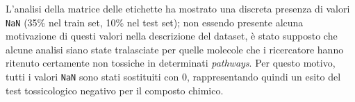 L'analisi della matrice delle etichette ha mostrato una discreta presenza di valori \texttt{NaN} (35\% nel train set, 10\% nel test set); non essendo presente alcuna motivazione di questi valori nella descrizione del dataset, è stato supposto che alcune analisi siano state tralasciate per quelle molecole che i ricercatore hanno ritenuto certamente non tossiche in determinati \textit{pathways}. Per questo motivo, tutti i valori \texttt{NaN} sono stati sostituiti con $0$, rappresentando quindi un esito del test tossicologico negativo per il composto chimico.
\begin{figure}[!ht]
	\centering
	\quad
	\quad
	\quad
	\\	\quad
	\quad

\end{figure}
